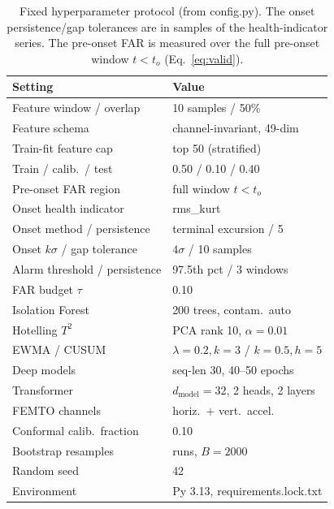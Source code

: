 \documentclass[IJPHM, 2026, 0]{PHMSociety}
\begin{document}
\begin{table}[t] \small
	\begin{center}
	\caption{Fixed hyperparameter protocol (from config.py). The onset persistence/gap tolerances are in samples of the health-indicator series. The pre-onset FAR is measured over the full pre-onset window $t < t_o$ (Eq.~\ref{eq:valid}).}
	\label{tab:hyperparams}
	\begin{tabular}{l l}
		\hline \hline
		\textbf{Setting} & \textbf{Value} \\
		\hline
		Feature window / overlap & 10 samples / 50\% \\
		Feature schema & channel-invariant, 49-dim \\
		Train-fit feature cap & top 50 (stratified) \\
		Train / calib.\ / test & 0.50 / 0.10 / 0.40 \\
		Pre-onset FAR region & full window $t < t_o$ \\
		Onset health indicator & rms\_kurt \\
		Onset method / persistence & terminal excursion / 5 \\
		Onset $k\sigma$ / gap tolerance & $4\sigma$ / 10 samples \\
		Alarm threshold / persistence & 97.5th pct / 3 windows \\
		FAR budget $\tau$ & 0.10 \\
		Isolation Forest & 200 trees, contam.\ auto \\
		Hotelling $T^2$ & PCA rank 10, $\alpha=0.01$ \\
		EWMA / CUSUM & $\lambda{=}0.2, k{=}3$ / $k{=}0.5, h{=}5$ \\
		Deep models & seq-len 30, 40--50 epochs \\
		Transformer & $d_{\text{model}}{=}32$, 2 heads, 2 layers \\
		FEMTO channels & horiz.\ + vert.\ accel. \\
		Conformal calib.\ fraction & 0.10 \\
		Bootstrap resamples & runs, $B{=}2000$ \\
		Random seed & 42 \\
		Environment & Py 3.13, requirements.lock.txt \\
		\hline \hline
	\end{tabular}
	\end{center}
\end{table}
\end{document}
